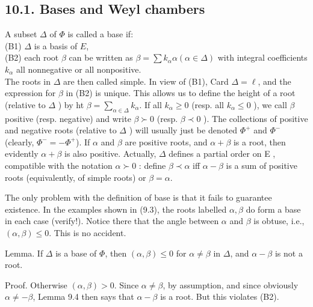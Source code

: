 \documentclass[10pt]{article}
\begin{document}
\subsection*{10.1. Bases and Weyl chambers}
A subset $\Delta$ of $\Phi$ is called a base if:\\
(B1) $\Delta$ is a basis of $E$,\\
(B2) each root $\beta$ can be written as $\beta=\sum k_{\alpha} \alpha(\alpha \in \Delta)$ with integral coefficients $k_{\alpha}$ all nonnegative or all nonpositive.\\
The roots in $\Delta$ are then called simple. In view of (B1), Card $\Delta=\ell$, and the expression for $\beta$ in (B2) is unique. This allows us to define the height of a root (relative to $\Delta$ ) by ht $\beta=\sum_{\alpha \in \Delta} k_{\alpha}$. If all $k_{\alpha} \geq 0$ (resp. all $k_{\alpha} \leq 0$ ), we call $\beta$ positive (resp. negative) and write $\beta \succ 0$ (resp. $\beta \prec 0$ ). The collections of positive and negative roots (relative to $\Delta$ ) will usually just be denoted $\Phi^{+}$ and $\Phi^{-}$(clearly, $\Phi^{-}=-\Phi^{+}$). If $\alpha$ and $\beta$ are positive roots, and $\alpha+\beta$ is a root, then evidently $\alpha+\beta$ is also positive. Actually, $\Delta$ defines a partial order on E , compatible with the notation $\alpha \succ 0$ : define $\beta \prec \alpha$ iff $\alpha-\beta$ is a sum of positive roots (equivalently, of simple roots) or $\beta=\alpha$.

The only problem with the definition of base is that it fails to guarantee existence. In the examples shown in (9.3), the roots labelled $\alpha, \beta$ do form a base in each case (verify!). Notice there that the angle between $\alpha$ and $\beta$ is obtuse, i.e., $(\alpha, \beta) \leq 0$. This is no accident.

Lemma. If $\Delta$ is a base of $\Phi$, then $(\alpha, \beta) \leq 0$ for $\alpha \neq \beta$ in $\Delta$, and $\alpha-\beta$ is not a root.

Proof. Otherwise $(\alpha, \beta)>0$. Since $\alpha \neq \beta$, by assumption, and since obviously $\alpha \neq-\beta$, Lemma 9.4 then says that $\alpha-\beta$ is a root. But this violates (B2).
\end{document}
